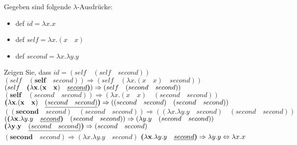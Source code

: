 \begin{card}
  Gegeben sind folgende $\lambda$-Ausdrücke:
  \begin{itemize}
    \item def $id = \lambda x.x$
    \item def $self = \lambda x.(x \quad x)$
    \item def $second = \lambda x.\lambda y. y$
  \end{itemize}
  Zeigen Sie, dass $id = (self \quad (self \quad second))$
  \hr
  $(self \quad (\textbf{self} \quad second)) \Rightarrow (self \quad (\lambda x.(x \quad x) \quad second))$
  \vfill
  $(self \quad \textbf{(}\lambda \textbf{x}.(\textbf{x} \quad \textbf{x}) \quad \uline{second}\textbf{)}) \Rightarrow 
  (self \quad (second \quad second))$
  \vfill
  $(\textbf{self} \quad (second \quad second)) \Rightarrow 
  (\lambda x.(x \quad x) \quad (second \quad second))$
  \vfill
  $\textbf{(}\lambda \textbf{x}.(\textbf{x} \quad \textbf{x}) \quad \uline{(second \quad second)}\textbf{)} \Rightarrow
  ((second \quad second) \quad (second \quad second))$
  \vfill
  $((\textbf{second} \quad second) \quad (second \quad second)) \Rightarrow ((\lambda x.\lambda y. y \quad second) \quad (second \quad second))$
  \vfill
  $(\textbf{(}\lambda \textbf{x}.\lambda y. y \quad \uline{second}\textbf{)} \quad (second \quad second)) \Rightarrow (\lambda y. y \quad (second \quad second))$
  \vfill
  $\textbf{(}\lambda \textbf{y}. \textbf{y} \quad \uline{(second \quad second)}\textbf{)} \Rightarrow (second \quad second)$
  \vfill
  $(\textbf{second} \quad second) \Rightarrow (\lambda x.\lambda y. y \quad second)$
  \vfill
  $\textbf{(}\lambda \textbf{x}.\lambda y. y \quad \uline{second}\textbf{)} \Rightarrow \lambda y. y \Leftrightarrow \lambda x.x$
\end{card}


